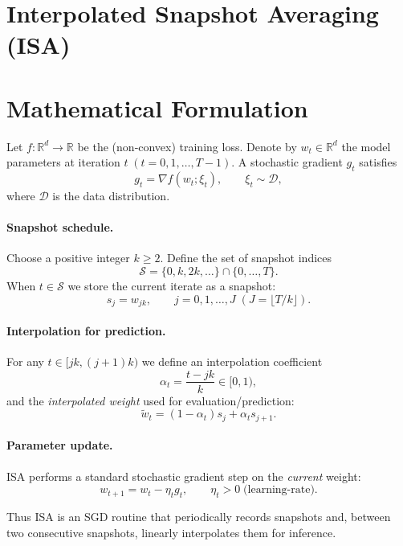 \documentclass{article}
\newcommand{\R}{\mathbb{R}}
\begin{document}
\section*{Interpolated Snapshot Averaging (ISA)}

\section*{Mathematical Formulation}
Let $f:\R^{d}\rightarrow\R$ be the (non‑convex) training loss.  
Denote by $w_t\in\R^{d}$ the model parameters at iteration $t\;(t=0,1,\dots,T-1)$.  
A stochastic gradient $g_t$ satisfies
\[
g_t = \nabla f(w_t; \xi_t),\qquad \xi_t\sim\mathcal{D},
\]
where $\mathcal{D}$ is the data distribution.

\paragraph{Snapshot schedule.}
Choose a positive integer $k\ge 2$.  
Define the set of snapshot indices
\[
\mathcal{S}=\{0,k,2k,\dots\}\cap\{0,\dots,T\}.
\]
When $t\in\mathcal{S}$ we store the current iterate as a snapshot:
\[
s_{j}=w_{jk},\qquad j=0,1,\dots,J\;(J=\lfloor T/k\rfloor).
\]

\paragraph{Interpolation for prediction.}
For any $t\in[jk,(j+1)k)$ we define an interpolation coefficient
\[
\alpha_t = \frac{t-jk}{k}\in[0,1),
\]
and the \emph{interpolated weight} used for evaluation/prediction:
\[
\tilde w_t = (1-\alpha_t)s_{j}+ \alpha_t s_{j+1}.
\tag{1}
\]

\paragraph{Parameter update.}
ISA performs a standard stochastic gradient step on the \emph{current} weight:
\[
w_{t+1}= w_t - \eta_t g_t ,\qquad \eta_t>0\;\text{(learning‑rate)}.
\tag{2}
\]

Thus ISA is an SGD routine that periodically records snapshots and,
between two consecutive snapshots, linearly interpolates them for inference.
\end{document}
